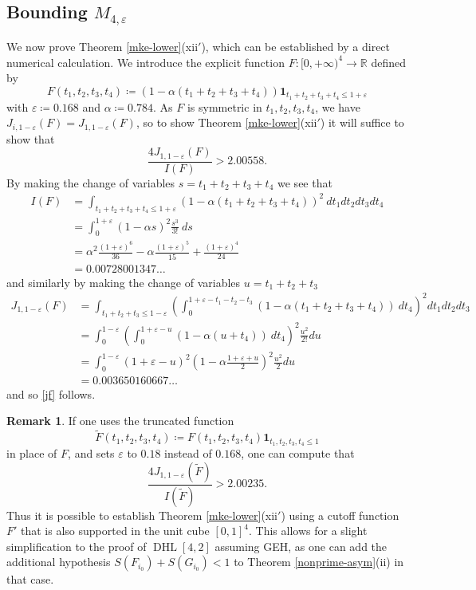 \documentclass{bmcart}
\DeclareMathOperator*\DHL{DHL}
\theoremstyle{plain}
\theoremstyle{definition}
\newtheorem{remark}[theorem]{Remark}
\newcommand\R{\mathbb{R}}
\newcommand\eps{\varepsilon}
\newcommand{\onef}{\mathbf{1}}
\begin{document}
\subsection{Bounding \texorpdfstring{$M_{4,\eps}$}{M4,0.18}}\label{4d}

We now prove Theorem \ref{mke-lower}(xii$'$), which can be established by a direct numerical calculation.  We introduce the explicit function $F: [0,+\infty)^4 \to \R$ defined by
$$ F(t_1,t_2,t_3,t_4) \coloneqq (1 - \alpha (t_1+t_2+t_3+t_4)) \onef_{t_1+t_2+t_3+t_4 \leq 1+\eps}$$
with $\eps \coloneqq 0.168$ and $\alpha \coloneqq 0.784$.  As $F$ is symmetric in $t_1,t_2,t_3,t_4$, we have $J_{i,1-\eps}(F) = J_{1,1-\eps}(F)$, so to show Theorem \ref{mke-lower}(xii$'$) it will suffice to show that
\begin{equation}\label{jf}
 \frac{4 J_{1,1-\eps}(F)}{I(F)} > 2.00558.
\end{equation}
By making the change of variables $s=t_1+t_2+t_3+t_4$ we see that
\begin{align*}
I(F) &= \int_{t_1+t_2+t_3+t_4 \leq 1+\eps} (1-\alpha(t_1+t_2+t_3+t_4))^2\ dt_1 dt_2 dt_3 dt_4 \\
&= \int_0^{1+\eps} (1-\alpha s)^2 \frac{s^3}{3!}\ ds\\
&= \alpha^2 \frac{(1+\eps)^6}{36} - \alpha \frac{(1+\eps)^5}{15} + \frac{(1+\eps)^4}{24} \\
&= 0.00728001347\dots
\end{align*}
and similarly by making the change of variables $u = t_1+t_2+t_3$
\begin{align*}
J_{1,1-\eps}(F) &= \int_{t_1+t_2+t_3 \leq 1-\eps} (\int_0^{1+\eps-t_1-t_2-t_3} (1-\alpha(t_1+t_2+t_3+t_4))\ dt_4)^2 dt_1 dt_2 dt_3 \\
&= \int_0^{1-\eps} (\int_0^{1+\eps-u} (1-\alpha(u+t_4))\ dt_4)^2 \frac{u^2}{2!} du \\
&= \int_0^{1-\eps} (1+\eps-u)^2 (1-\alpha \frac{1+\eps+u}{2})^2 \frac{u^2}{2} du  \\
&= 0.003650160667\dots
\end{align*}
and so \eqref{jf} follows.

\begin{remark}  If one uses the truncated function
$$ \tilde F(t_1,t_2,t_3,t_4) \coloneqq F(t_1,t_2,t_3,t_4) \onef_{t_1,t_2,t_3,t_4 \leq 1}$$
in place of $F$, and sets $\eps$ to $0.18$ instead of $0.168$, one can compute that
$$ \frac{4 J_{1,1-\eps}(\tilde F)}{I(\tilde F)} > 2.00235.$$
Thus it is possible to establish Theorem \ref{mke-lower}(xii$'$) using a cutoff function $F'$ that is also supported in the unit cube $[0,1]^4$.  This allows for a slight simplification to the proof of $\DHL[4,2]$ assuming GEH, as one can add the additional hypothesis $S(F_{i_0})+S(G_{i_0}) < 1$ to Theorem \ref{nonprime-asym}(ii) in that case.
\end{remark}
\end{document}
